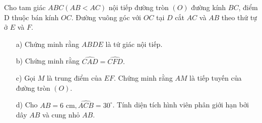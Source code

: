 \begin{ex}%

Cho tam giác $ABC (AB < AC)$ nội tiếp đường tròn $(O)$ đường kính $BC$, điểm D thuộc bán kính $OC$. Đường vuông góc với $OC$ tại $D$ cắt $AC$ và $AB$ theo thứ tự ở $E$ và $F$.
\begin{enumerate}
\item[a)] Chứng minh rằng $ABDE$ là tứ giác nội tiếp. 
\item[b)] Chứng minh rằng $\widehat{CAD} = \widehat{CFD}.$   
\item[c)] Gọi $M$ là trung điểm của $EF$. Chứng minh rằng $AM$ là tiếp tuyến của đường tròn $(O).$
\item[d)] Cho $AB = 6 \mbox{ cm}, \widehat{ACB} = 30^\circ$. Tính diện tích hình viên phân giới hạn bởi dây $AB$ và cung nhỏ $AB$. 
\end{enumerate}
\loigiai
	{

\begin{enumerate}


\end{enumerate}}
\end{ex}
